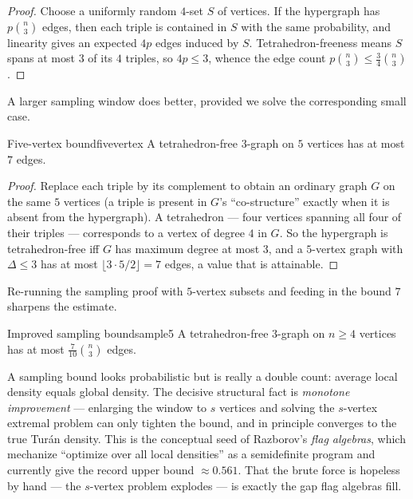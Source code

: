 \begin{proof}
Choose a uniformly random $4$-set $S$ of vertices. If the hypergraph has
$p\binom n3$ edges, then each triple is contained in $S$ with the same
probability, and linearity gives an expected $4p$ edges induced by $S$.
Tetrahedron-freeness means $S$ spans at most $3$ of its $4$ triples, so
$4p\le 3$, whence the edge count $p\binom n3\le\tfrac34\binom n3$.
\end{proof}

A larger sampling window does better, provided we solve the corresponding
small case.

\begin{lemma}{Five-vertex bound}{fivevertex}
A tetrahedron-free $3$-graph on $5$ vertices has at most $7$ edges.
\end{lemma}

\begin{proof}
Replace each triple by its complement to obtain an ordinary graph $G$ on the
same $5$ vertices (a triple is present in $G$'s ``co-structure'' exactly when
it is absent from the hypergraph). A tetrahedron --- four vertices spanning
all four of their triples --- corresponds to a vertex of degree $4$ in $G$.
So the hypergraph is tetrahedron-free iff $G$ has maximum degree at most $3$,
and a $5$-vertex graph with $\Delta\le 3$ has at most
$\lfloor 3\cdot5/2\rfloor=7$ edges, a value that is attainable.
\end{proof}

Re-running the sampling proof with $5$-vertex subsets and feeding in the bound
$7$ sharpens the estimate.

\begin{proposition}{Improved sampling bound}{sample5}
A tetrahedron-free $3$-graph on $n\ge4$ vertices has at most
$\tfrac{7}{10}\binom n3$ edges.
\end{proposition}

\begin{insight}
A sampling bound looks probabilistic but is really a double count: average
local density equals global density. The decisive structural fact is
\emph{monotone improvement} --- enlarging the window to $s$ vertices and
solving the $s$-vertex extremal problem can only tighten the bound, and in
principle converges to the true Tur\'an density. This is the conceptual seed
of Razborov's \emph{flag algebras}, which mechanize ``optimize over all local
densities'' as a semidefinite program and currently give the record upper
bound $\approx 0.561$. That the brute force is hopeless by hand --- the
$s$-vertex problem explodes --- is exactly the gap flag algebras fill.
\end{insight}

